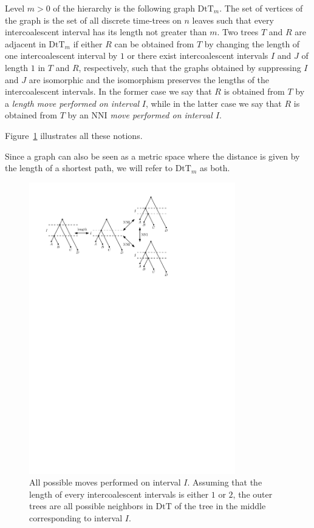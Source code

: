 \documentclass{amsart}
\theoremstyle{definition}
\newcommand{\nni}{\mathrm{NNI}}
\newcommand{\dtt}{\mathrm{DtT}}
\begin{document}
Level $m > 0$ of the hierarchy is the following graph $\dtt_m$.
The set of vertices of the graph is the set of all discrete time-trees on $n$ leaves such that every intercoalescent interval has its length not greater than $m$.
Two trees $T$ and $R$ are adjacent in $\dtt_m$ if either $R$ can be obtained from $T$ by changing the length of one intercoalescent interval by $1$ or there exist intercoalescent intervals $I$ and $J$ of length $1$ in $T$ and $R$, respectively, such that the graphs obtained by suppressing $I$ and $J$ are isomorphic and the isomorphism preserves the lengths of the intercoalescent intervals.
In the former case we say that $R$ is obtained from $T$ by a \textit{length move performed on interval} $I$, while in the latter case we say that $R$ is obtained from $T$ by an \textit{$\nni$ move performed on interval $I$}.

Figure~\ref{DtT.pdf} illustrates all these notions.

Since a graph can also be seen as a metric space where the distance is given by the length of a shortest path, we will refer to $\dtt_m$ as both.

\begin{figure}[ht]
\centering
\includegraphics[width=0.8\textwidth]{DtT.pdf}
\caption{All possible moves performed on interval $I$.
Assuming that the length of every intercoalescent intervals is either $1$ or $2$, the outer trees are all possible neighbors in $\dtt$ of the tree in the middle corresponding to interval $I$.}
\label{DtT.pdf}
\end{figure}
\end{document}
